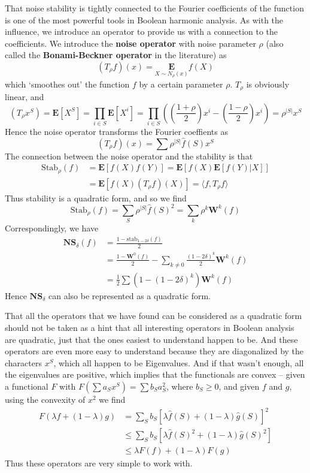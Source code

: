 That noise stability is tightly connected to the Fourier coefficients of the function is one of the most powerful tools in Boolean harmonic analysis. As with the influence, we introduce an operator to provide us with a connection to the coefficients. We introduce the {\bf noise operator} with noise parameter $\rho$ (also called the {\bf Bonami-Beckner operator} in the literature) as
%
\[ (T_\rho f)(x) = \underset{X \sim N_\rho(x)}{\mathbf{E}} f(X) \]
%
which `smoothes out' the function $f$ by a certain parameter $\rho$. $T_\rho$ is obviously linear, and
%
\[ (T_\rho x^S) = \mathbf{E}[X^S] = \prod_{i \in S} \mathbf{E}[X^i] = \prod_{i \in S} \left( \left( \frac{1 + \rho}{2} \right) x^i - \left( \frac{1 - \rho}{2} \right) x^i \right) = \rho^{|S|} x^S \]
%
Hence the noise operator transforms the Fourier coeffients as
%
\[ (T_\rho f)(x) = \sum \rho^{|S|} \widehat{f}(S) x^S \]
%
The connection between the noise operator and the stability is that
%
\begin{align*}
    \text{Stab}_\rho(f) &= \mathbf{E}[f(X)f(Y)] = \mathbf{E}[f(X)\mathbf{E}[f(Y) | X]]\\
    &= \mathbf{E}[f(X) (T_\rho f)(X)] = \langle f, T_\rho f \rangle
\end{align*}
%
Thus stability is a quadratic form, and so we find
%
\[ \text{Stab}_\rho(f) = \sum_S \rho^{|S|} \widehat{f}(S)^2 = \sum_k \rho^k \mathbf{W}^k(f) \]
%
Correspondingly, we have
%
\begin{align*}
    \mathbf{NS}_\delta(f) &= \frac{1 - \text{stab}_{1 - 2\delta}(f)}{2}\\
    &= \frac{1 - \mathbf{W}^0(f)}{2} - \sum_{k \neq 0} \frac{(1 - 2\delta)^k}{2} \mathbf{W}^k(f)\\
    &= \frac{1}{2} \sum (1 - (1 - 2\delta)^k) \mathbf{W}^k(f)
\end{align*}
%
Hence $\mathbf{NS}_\delta$ can also be represented as a quadratic form.

That all the operators that we have found can be considered as a quadratic form should not be taken as a hint that all interesting operators in Boolean analysis are quadratic, just that the ones easiest to understand happen to be. And these operators are even more easy to understand because they are diagonalized by the characters $x^S$, which all happen to be Eigenvalues. And if that wasn't enough, all the eigenvalues are positive, which implies that the functionals are convex -- given a functional $F$ with $F(\sum a_S x^S) = \sum b_S a_S^2$, where $b_S \geq 0$, and given $f$ and $g$, using the convexity of $x^2$ we find
%
\begin{align*}
    F(\lambda f + (1 - \lambda) g) &= \sum_S b_S \left[ \lambda \widehat{f}(S) + (1 - \lambda) \widehat{g}(S) \right]^2\\
    &\leq \sum_S b_S \left[ \lambda \widehat{f}(S)^2 + (1 - \lambda) \widehat{g}(S)^2 \right]\\
    &\leq \lambda F(f) + (1 - \lambda) F(g)
\end{align*}
%
Thus these operators are very simple to work with.

